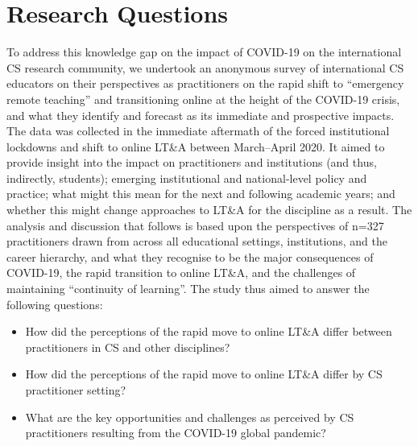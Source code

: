 \documentclass[conference]{IEEEtran}
\begin{document}


\section{Research Questions}\label{rqs}

To address this knowledge gap on the impact of COVID-19 on the
international CS research community, we undertook an anonymous survey
of international CS educators on their perspectives as practitioners
on the rapid shift to ``emergency remote teaching'' and transitioning
online at the height of the COVID-19 crisis, and what they identify
and forecast as its immediate and prospective impacts. The data was
collected in the immediate aftermath of the forced institutional
lockdowns and shift to online LT\&A between March--April 2020. It
aimed to provide insight into the impact on practitioners and
institutions (and thus, indirectly, students); emerging institutional
and national-level policy and practice; what might this mean for the
next and following academic years; and whether this might change
approaches to LT\&A for the discipline as a result. The analysis and
discussion that follows is based upon the perspectives of n=327
practitioners drawn from across all educational settings,
institutions, and the career hierarchy, and what they recognise to be
the major consequences of COVID-19, the rapid transition to online
LT\&A, and the challenges of maintaining ``continuity of learning''.
The study thus aimed to answer the following questions:

\begin{itemize}
\item How did the perceptions of the rapid move to online LT\&A differ
between practitioners in CS and other disciplines?
\item How did the perceptions of the rapid move to online LT\&A differ by
CS practitioner setting?
\item What are the key opportunities and challenges as perceived by CS
practitioners resulting from the COVID-19 global pandemic?
\end{itemize}
\end{document}
